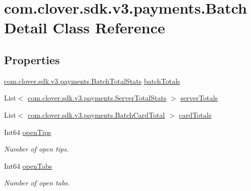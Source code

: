 \hypertarget{classcom_1_1clover_1_1sdk_1_1v3_1_1payments_1_1_batch_detail}{}\section{com.\+clover.\+sdk.\+v3.\+payments.\+Batch\+Detail Class Reference}
\label{classcom_1_1clover_1_1sdk_1_1v3_1_1payments_1_1_batch_detail}
\subsection*{Properties}
\begin{DoxyCompactItemize}
\item 
\hyperlink{classcom_1_1clover_1_1sdk_1_1v3_1_1payments_1_1_batch_total_stats}{com.\+clover.\+sdk.\+v3.\+payments.\+Batch\+Total\+Stats} \hyperlink{classcom_1_1clover_1_1sdk_1_1v3_1_1payments_1_1_batch_detail_aa4eedeba3c3089309aea780ec366f1de}{batch\+Totals}
\item 
List$<$ \hyperlink{classcom_1_1clover_1_1sdk_1_1v3_1_1payments_1_1_server_total_stats}{com.\+clover.\+sdk.\+v3.\+payments.\+Server\+Total\+Stats} $>$ \hyperlink{classcom_1_1clover_1_1sdk_1_1v3_1_1payments_1_1_batch_detail_a5f60c0db6c1d97e3f3776fabbf05429d}{server\+Totals}
\item 
List$<$ \hyperlink{classcom_1_1clover_1_1sdk_1_1v3_1_1payments_1_1_batch_card_total}{com.\+clover.\+sdk.\+v3.\+payments.\+Batch\+Card\+Total} $>$ \hyperlink{classcom_1_1clover_1_1sdk_1_1v3_1_1payments_1_1_batch_detail_a4ec6864a0a6ad50a8c4be67f6b4a14d1}{card\+Totals}
\item 
Int64 \hyperlink{classcom_1_1clover_1_1sdk_1_1v3_1_1payments_1_1_batch_detail_a81b8732afda13d6df5de5ef93aa05f47}{open\+Tips}
\begin{DoxyCompactList}\small\item\em Number of open tips. \end{DoxyCompactList}\item 
Int64 \hyperlink{classcom_1_1clover_1_1sdk_1_1v3_1_1payments_1_1_batch_detail_a31e7d8d50ee2df7c1373e0ff0412c7dc}{open\+Tabs}
\begin{DoxyCompactList}\small\item\em Number of open tabs. \end{DoxyCompactList}\end{DoxyCompactItemize}


